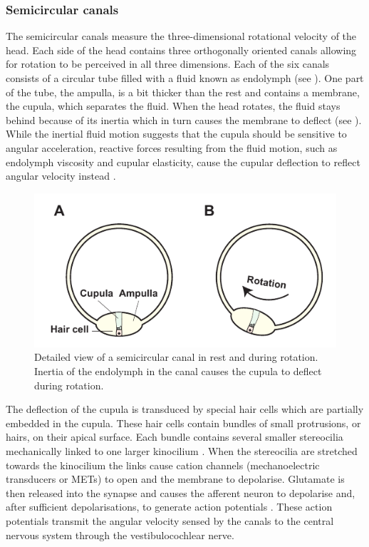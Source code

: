 \subsubsection{Semicircular canals}

The semicircular canals measure the three-dimensional rotational velocity of the head. Each side of the head contains three orthogonally oriented canals allowing for rotation to be perceived in all three dimensions. Each of the six canals consists of a circular tube filled with a fluid known as endolymph (see ). One part of the tube, the ampulla, is a bit thicker than the rest and contains a membrane, the cupula, which separates the fluid. When the head rotates, the fluid stays behind because of its inertia which in turn causes the membrane to deflect (see ). While the inertial fluid motion suggests that the cupula should be sensitive to angular acceleration, reactive forces resulting from the fluid motion, such as endolymph viscosity and cupular elasticity,  cause the cupular deflection to reflect angular velocity instead \cite{goldberg2012}.

\begin{figure}
    \includegraphics[width=1.0\textwidth]{src/intro/figures/canals.pdf}
    \caption{Detailed view of a semicircular canal  in rest and  during rotation. Inertia of the endolymph in the canal causes the cupula to deflect during rotation.}
    \label{intro:fig:canals}
\end{figure}

The deflection of the cupula is transduced by special hair cells which are partially embedded in the cupula. These hair cells contain bundles of small protrusions, or hairs, on their apical surface. Each bundle contains several smaller stereocilia mechanically linked to one larger kinocilium \cite{pickles1984}. When the stereocilia are stretched towards the kinocilium the links cause cation channels (mechanoelectric transducers or METs) to open and the membrane to depolarise. Glutamate is then released into the synapse and causes the afferent neuron to depolarise and, after sufficient depolarisations, to generate action potentials \cite{purves2012}. These action potentials transmit the angular velocity sensed by the canals to the central nervous system through the vestibulocochlear nerve.

